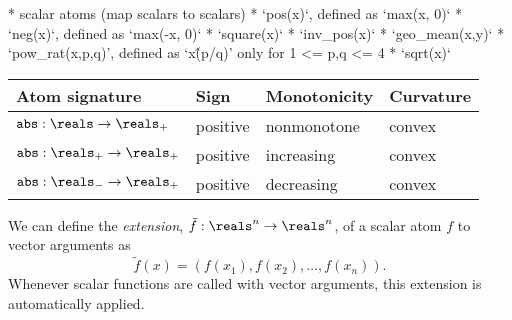 \documentclass[11pt]{article}
\begin{document}
* scalar atoms (map scalars to scalars)
  * `pos(x)`, defined as `max(x, 0)`
  * `neg(x)`, defined as `max(-x, 0)`
  * `square(x)`
  * `inv\_pos(x)`
  * `geo\_mean(x,y)`
  * `pow\_rat(x,p,q)', defined as `x\^(p/q)' only for 1 <= p,q <= 4
  * `sqrt(x)`
\begin{table}
  \centering
\begin{tabular}{|l|l|l|l|} \hline
  Atom signature & Sign & Monotonicity & Curvature \\ \hline
  ${\tt abs} : \reals \to \reals_+$ & positive & nonmonotone & convex \\ \hline
  ${\tt abs} : \reals_+ \to \reals_+$ & positive & increasing & convex \\ \hline
  ${\tt abs} : \reals_- \to \reals_+$ & positive & decreasing & convex \\ \hline
\end{tabular}
\end{table}


We can define the \emph{extension}, $\tilde f : \reals^n \to \reals^n$, 
of a scalar atom $f$ to vector arguments as
\[
\tilde f(x) = \left( f(x_1), f(x_2), \ldots, f(x_n) \right).
\]
Whenever scalar functions are called with vector arguments, this extension
is automatically applied.
\end{document}
